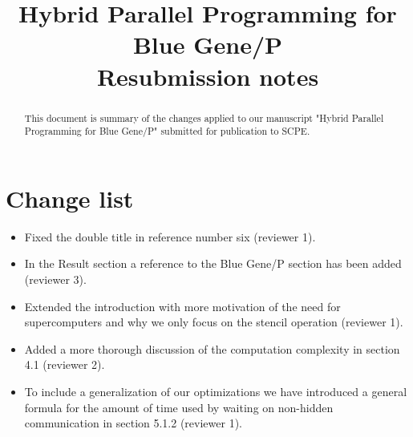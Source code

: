 \documentclass[preprint,3p,times]{elsarticle}
\begin{document}
\begin{frontmatter}

\title{Hybrid Parallel Programming for Blue Gene/P \\ Resubmission notes}

\begin{abstract}
This document is summary of the changes applied to our manuscript "Hybrid Parallel Programming for Blue Gene/P" submitted for publication to SCPE.
\end{abstract}

\end{frontmatter}

\section{Change list}
\begin{itemize}
\item Fixed the double title in reference number six (reviewer 1).
\item In the Result section a reference to the Blue Gene/P section has been added (reviewer 3).
\item Extended the introduction with more motivation of the need for supercomputers and why we only focus on the stencil operation (reviewer 1).
\item Added a more thorough discussion of the computation complexity in section 4.1 (reviewer 2).
\item To include a generalization of our optimizations we have introduced a general formula for the amount of time used by waiting on non-hidden communication in section 5.1.2 (reviewer 1).
\end{itemize}
\end{document}
